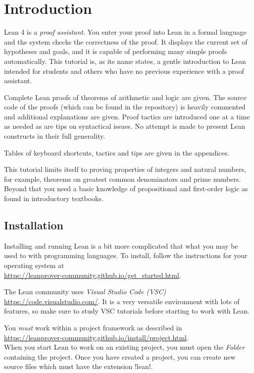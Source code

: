 
\section{Introduction}

Lean 4 is a \emph{proof assistant}. You enter your proof into Lean in a formal language and the system checks the correctness of the proof. It displays the current set of hypotheses and goals, and it is capable of performing many simple proofs automatically. This tutorial is, as its name states, a gentle introduction to Lean intended for students and others who have no previous experience with a proof assistant.

Complete Lean proofs of theorems of arithmetic and logic are given. The source code of the proofs (which can be found in the repository) is heavily commented and additional explanations are given. Proof tactics are introduced one at a time as needed as are tips on syntactical issues. No attempt is made to present Lean constructs in their full generality.

Tables of keyboard shortcuts, tactics and tips are given in the appendices.

This tutorial limits itself to proving properties of integers and natural numbers, for example, theorems on greatest common denominators and prime numbers. Beyond that you need a basic knowledge of propositional and first-order logic as found in introductory textbooks.

\subsection*{Installation}

Installing and running Lean is a bit more complicated that what you may be used to with programming languages. To install, follow the instructions for your operating system at\\
\indnt\url{https://leanprover-community.github.io/get_started.html}.

The Lean community uses \emph{Visual Studio Code (VSC)} \url{https://code.visualstudio.com/}. It is a very versatile environment with lots of features, so make sure to study VSC tutorials before starting to work with Lean.

You \emph{must} work within a project framework as described in\\ \indnt\url{https://leanprover-community.github.io/install/project.html}.\\ When you start Lean to work on an existing project, you must open the \emph{Folder} containing the project. Once you have created a project, you can create new source files which must have the extension !lean!.

